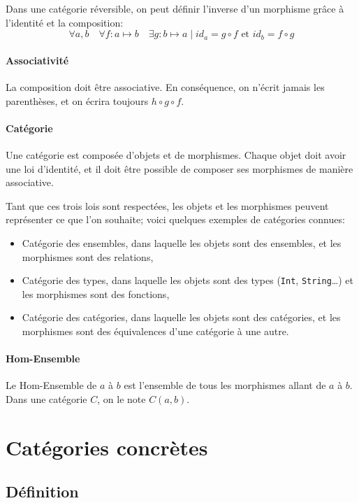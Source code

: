 \documentclass[a4paper,10pt,french,openany]{memoir}
\DeclareMathOperator\after{\circ}
\begin{document}
Dans une catégorie réversible, on peut définir l'inverse d'un morphisme grâce à l'identité et la composition:
\[ \forall a,b \quad \forall f: a \mapsto b \quad \exists g: b \mapsto a \;|\; id_a = g \after f \text{ et } id_b = f \after g \]

\paragraph{Associativité}
La composition doit être associative. En conséquence, on n'écrit jamais les parenthèses, et on écrira toujours $h \after g \after f$.

\paragraph{Catégorie}
Une catégorie est composée d'objets et de morphismes. Chaque objet doit avoir une loi d'identité, et il doit être possible de composer ses morphismes de manière associative.

Tant que ces trois lois sont respectées, les objets et les morphismes peuvent représenter ce que l'on souhaite; voici quelques exemples de catégories connues:
\begin{itemize}
 \item Catégorie des ensembles, dans laquelle les objets sont des ensembles, et les morphismes sont des relations,
 \item Catégorie des types, dans laquelle les objets sont des types (\lstinline{Int}, \lstinline{String}\dots) et les morphismes sont des fonctions,
 \item Catégorie des catégories, dans laquelle les objets sont des catégories, et les morphismes sont des équivalences d'une catégorie à une autre.
\end{itemize}

\paragraph{Hom-Ensemble}
Le Hom-Ensemble de $a$ à $b$ est l'ensemble de tous les morphismes allant de $a$ à $b$. Dans une catégorie $C$, on le note $C(a, b)$.

\section{Catégories concrètes}

\subsection{Définition}
\end{document}
